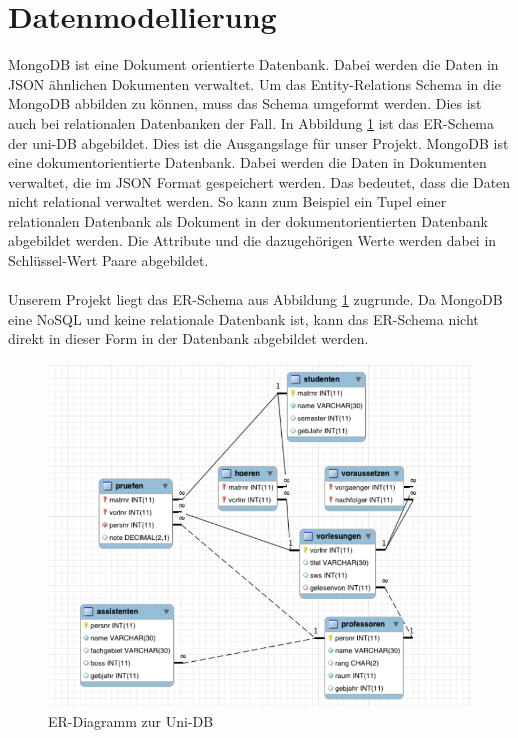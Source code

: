 \section{Datenmodellierung}
\label{kap:ERDiagramm}
MongoDB ist eine Dokument orientierte Datenbank. Dabei werden die Daten in JSON
ähnlichen Dokumenten verwaltet. Um das Entity-Relations Schema in die MongoDB
abbilden zu können, muss das Schema umgeformt werden. Dies ist auch bei
relationalen Datenbanken der Fall. In Abbildung \ref{fig:uni-db} ist das
ER-Schema der uni-DB abgebildet. Dies ist die Ausgangslage für unser Projekt.
MongoDB ist eine dokumentorientierte Datenbank. Dabei werden die Daten in Dokumenten verwaltet, die im JSON Format gespeichert werden. Das bedeutet, dass die Daten nicht relational
verwaltet werden. So kann zum Beispiel ein Tupel einer relationalen Datenbank
als Dokument in der dokumentorientierten Datenbank abgebildet werden. Die
Attribute und die dazugehörigen Werte werden dabei in Schlüssel-Wert Paare
abgebildet. 
\\\\
Unserem Projekt liegt das ER-Schema aus Abbildung \ref{fig:uni-db}
zugrunde.
Da MongoDB eine NoSQL und keine relationale Datenbank ist, kann das ER-Schema nicht direkt
in dieser Form in der Datenbank abgebildet werden. 

\begin{figure}[h] 
	\centering
		\includegraphics[width=1\textwidth]{./pictures/SQL-DB_ER_Diagramm_UNI-DB.png}
	\caption{ER-Diagramm zur Uni-DB \cite{Kaufmann2016}}
	\label{fig:uni-db}
\end{figure}

